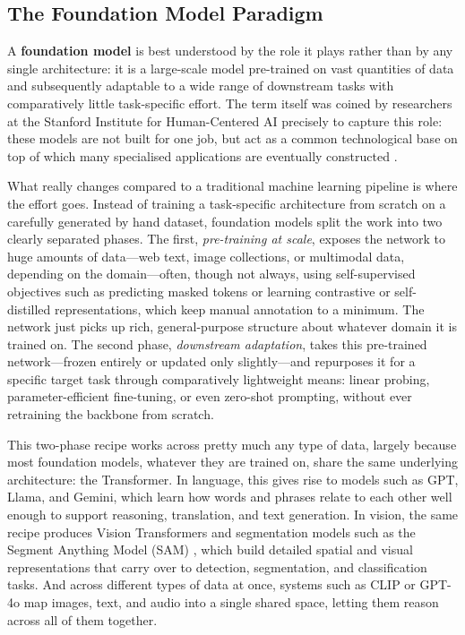 \subsection{The Foundation Model Paradigm}
\label{sec:framework:foundation_paradigm}

A \textbf{foundation model} is best understood by the role it plays rather than by any single architecture: it is a large-scale model pre-trained on vast quantities of data and subsequently adaptable to a wide range of downstream tasks with comparatively little task-specific effort. The term itself was coined by researchers at the Stanford Institute for Human-Centered AI precisely to capture this role: these models are not built for one job, but act as a common technological base on top of which many specialised applications are eventually constructed \cite{bommasani2021opportunities}.

What really changes compared to a traditional machine learning pipeline is where the effort goes. Instead of training a task-specific architecture from scratch on a carefully generated by hand dataset, foundation models split the work into two clearly separated phases. The first, \emph{pre-training at scale}, exposes the network to huge amounts of data---web text, image collections, or multimodal data, depending on the domain---often, though not always, using self-supervised objectives such as predicting masked tokens or learning contrastive or self-distilled representations, which keep manual annotation to a minimum. The network just picks up rich, general-purpose structure about whatever domain it is trained on. The second phase, \emph{downstream adaptation}, takes this pre-trained network---frozen entirely or updated only slightly---and repurposes it for a specific target task through comparatively lightweight means: linear probing, parameter-efficient fine-tuning, or even zero-shot prompting, without ever retraining the backbone from scratch.


This two-phase recipe works across pretty much any type of data, largely because most foundation models, whatever they are trained on, share the same underlying architecture: the Transformer. In language, this gives rise to models such as GPT, Llama, and Gemini, which learn how words and phrases relate to each other well enough to support reasoning, translation, and text generation. In vision, the same recipe produces Vision Transformers and segmentation models such as the Segment Anything Model (SAM) \cite{kirillov2023segment}, which build detailed spatial and visual representations that carry over to detection, segmentation, and classification tasks. And across different types of data at once, systems such as CLIP or GPT-4o map images, text, and audio into a single shared space, letting them reason across all of them together.


